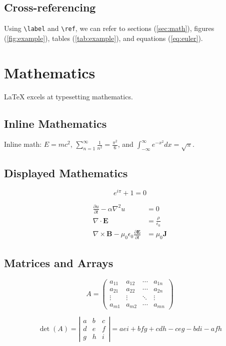 \documentclass{article}
\begin{document}
\subsection{Cross-referencing}
Using \verb|\label| and \verb|\ref|, we can refer to sections (\cref{sec:math}), figures (\cref{fig:example}), tables (\cref{tab:example}), and equations (\cref{eq:euler}).

\section{Mathematics}
\LaTeX{} excels at typesetting mathematics.

\subsection{Inline Mathematics}
Inline math: $E=mc^2$, $\displaystyle \sum_{n=1}^{\infty} \frac{1}{n^2} = \frac{\pi^2}{6}$, and $\int_{-\infty}^{\infty} e^{-x^2} dx = \sqrt{\pi}$.

\subsection{Displayed Mathematics}
\begin{equation}
\label{eq:euler}
e^{i\pi} + 1 = 0
\end{equation}

\begin{align}
\label{eq:heat}
\frac{\partial u}{\partial t} - \alpha \nabla^2 u &= 0 \\
\nabla \cdot \mathbf{E} &= \frac{\rho}{\epsilon_0} \\
\nabla \times \mathbf{B} - \mu_0 \epsilon_0 \frac{\partial \mathbf{E}}{\partial t} &= \mu_0 \mathbf{J}
\end{align}

\subsection{Matrices and Arrays}
\[
A = \begin{pmatrix}
a_{11} & a_{12} & \cdots & a_{1n} \\
a_{21} & a_{22} & \cdots & a_{2n} \\
\vdots & \vdots & \ddots & \vdots \\
a_{m1} & a_{m2} & \cdots & a_{mn}
\end{pmatrix}
\]

\[
\det(A) = \left|
\begin{array}{ccc}
a & b & c \\
d & e & f \\
g & h & i
\end{array}
\right| = aei + bfg + cdh - ceg - bdi - afh
\]
\end{document}
